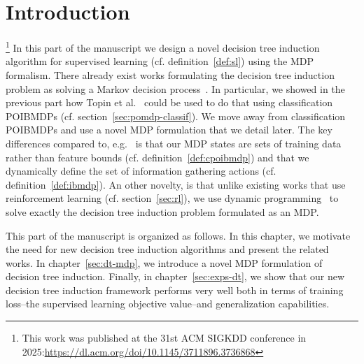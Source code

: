 \chapter{Introduction}\label{sec:part2}\footnote{This work was published at the 31st ACM SIGKDD conference in 2025:\url{https://dl.acm.org/doi/10.1145/3711896.3736868}}
In this part of the manuscript we design a novel decision tree induction algorithm for supervised learning (cf. definition~\ref{def:sl}) using the MDP formalism.
There already exist works formulating the decision tree induction problem as solving a Markov decision process~\cite{Dulac_Arnold_2011,garlapati2015reinforcementlearningapproachonline,topin2021iterative,chaouki2024branchesfastdynamicprogramming}.
In particular, we showed in the previous part how Topin et al.~\cite{topin2021iterative} could be used to do that using classification POIBMDPs (cf. section~\ref{sec:pomdp-classif}).
We move away from classification POIBMDPs and use a novel MDP formulation that we detail later.
The key differences compared to, e.g.~\cite{topin2021iterative} is that our MDP states are sets of training data rather than feature bounds (cf. definition~\ref{def:cpoibmdp}) and that we dynamically define the set of information gathering actions (cf. definition~\ref{def:ibmdp}).
An other novelty, is that unlike existing works that use reinforcement learning (cf. section~\ref{sec:rl}), we use dynamic programming~\cite{Bellman} to solve exactly the decision tree induction problem formulated as an MDP.

This part of the manuscript is organized as follows.
In this chapter, we motivate the need for new decision tree induction algorithms and present the related works.
In chapter~\ref{sec:dt-mdp}, we introduce a novel MDP formulation of decision tree induction.
Finally, in chapter~\ref{sec:exps-dt}, we show that our new decision tree induction framework performs very well both in terms of training loss--the supervised learning objective value--and generalization capabilities.

